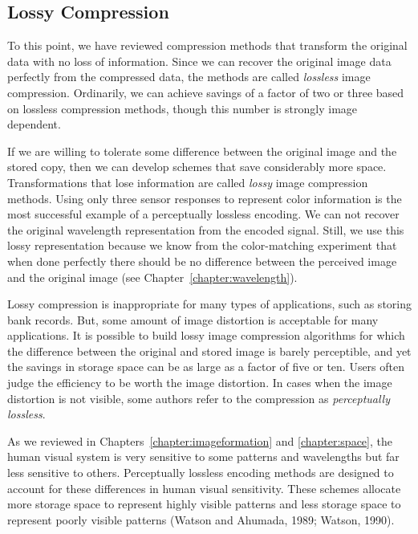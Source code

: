 \subsection*{Lossy Compression} To this point, we have reviewed
compression methods that transform the original data with no loss of
information.  Since we can recover the original image data perfectly
from the compressed data, the methods are called {\em lossless} image
compression.  Ordinarily, we can achieve savings of a factor of two or
three based on lossless compression methods, though this number is
strongly image dependent.

If we are willing to tolerate some difference between the original
image and the stored copy, then we can develop schemes that save
considerably more space.  Transformations that lose information are
called {\em lossy} image compression methods.  Using only three sensor
responses to represent color information is the most successful
example of a perceptually lossless encoding.  We can not recover the
original wavelength representation from the encoded signal.  Still, we
use this lossy representation because we know from the color-matching
experiment that when done perfectly there should be no difference
between the perceived image and the original image (see
Chapter~\ref{chapter:wavelength}).

Lossy compression is inappropriate for many types of applications,
such as storing bank records. But, some amount of image distortion is
acceptable for many applications.  It is possible to build lossy image
compression algorithms for which the difference between the original
and stored image is barely perceptible, and yet the savings in storage
space can be as large as a factor of five or ten.  Users often judge the
efficiency to be worth the image distortion.  In cases when the image
distortion is not visible, some authors refer to the compression as
{\em perceptually lossless}.

As we reviewed in Chapters~\ref{chapter:imageformation} and
\ref{chapter:space}, the human visual system is very sensitive to some
patterns and wavelengths but far less sensitive to others.
Perceptually lossless encoding methods are designed to account for
these differences in human visual sensitivity.  These schemes allocate
more storage space to represent highly visible patterns and less
storage space to represent poorly visible patterns (Watson and
Ahumada, 1989;  Watson, 1990).

